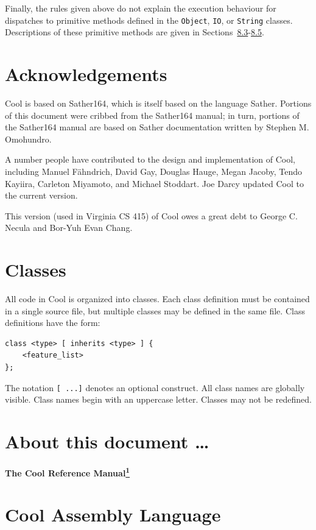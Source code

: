 \documentclass[]{article}
\begin{document}
Finally, the rules given above do not explain the execution behaviour
for dispatches to primitive methods defined in the \texttt{Object},
\texttt{IO}, or \texttt{String} classes. Descriptions of these primitive
methods are given in
Sections~\href{node29.html\#sec-int}{8.3}-\href{node31.html\#sec-bool}{8.5}.

\section{Acknowledgements}

Cool is based on Sather164, which is itself based on the language
Sather. Portions of this document were cribbed from the Sather164
manual; in turn, portions of the Sather164 manual are based on Sather
documentation written by Stephen M. Omohundro.

A number people have contributed to the design and implementation of
Cool, including Manuel Fähndrich, David Gay, Douglas Hauge, Megan
Jacoby, Tendo Kayiira, Carleton Miyamoto, and Michael Stoddart. Joe
Darcy updated Cool to the current version.

This version (used in Virginia CS 415) of Cool owes a great debt to
George C. Necula and Bor-Yuh Evan Chang.


\section{Classes}

All code in Cool is organized into classes. Each class definition must
be contained in a single source file, but multiple classes may be
defined in the same file. Class definitions have the form:

\begin{verbatim}
class <type> [ inherits <type> ] {
    <feature_list>
};
\end{verbatim}

The notation \texttt{{[} ...{]}} denotes an optional construct. All
class names are globally visible. Class names begin with an uppercase
letter. Classes may not be redefined.

\section{About this document \ldots{}}

\textbf{The Cool Reference
Manual\href{footnode.html\#foot266}{\textsuperscript{1}}}

\section{Cool Assembly Language}
\end{document}
